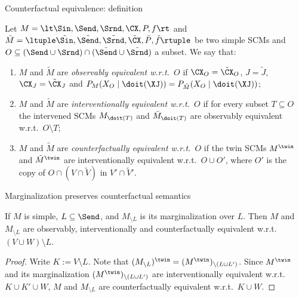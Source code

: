 \begin{frame}{Counterfactual equivalence: definition}
  \begin{Def}[\ref{def:scm_counterfactual_equiv}]
  Let $M = \lt \Sin, \Send, \Srnd, \CX, P, f \rt$ and
  $\tilde{M} = \ltuple \tilde{\Sin}, \tilde{\Send}, \tilde{\Srnd}, \tilde{\CX}, \tilde{P}, \tilde{f} \rtuple$ be two simple SCMs
  and $O \subseteq (\Send \cup \Srnd) \cap (\tilde{\Send} \cup \tilde{\Srnd})$ a subset.
  We say that:
  \begin{enumerate}
    \item {\color{gray}$M$ and $\tilde{M}$ are \emph{observably equivalent w.r.t.\ $O$} if $\CX_O = \tilde{\CX}_O$, $J = \tilde{J}$, $\CX_J = \tilde{\CX}_J$ and $P_{M}(X_O \mid \doit(\XJ)) = P_{\tilde{M}}(X_O \mid \doit(\XJ))$;}
    \item {\color{gray}$M$ and $\tilde{M}$ are \emph{interventionally equivalent w.r.t.\ $O$} if for every subset $T \subseteq O$ the intervened SCMs $M_{\doit(T)}$ and $\tilde{M}_{\doit(T)}$ are observably equivalent w.r.t.\ $O \setminus T$;}
    \item $M$ and $\tilde{M}$ are \emph{counterfactually equivalent w.r.t.\ $O$} if the twin SCMs $M^\twin$ and $\tilde{M}^\twin$ are interventionally equivalent w.r.t.\ $O \cup O'$, where
    $O'$ is the copy of $O \cap (V \cap \tilde{V})$ in $V' \cap \tilde{V}'$.
  \end{enumerate}
  \end{Def}
\end{frame}

\begin{frame}{Marginalization preserves counterfactual semantics}
  \begin{Cor}[\ref{Cor:various_equiv_marginalization}]
  If $M$ is simple, $L \subseteq \Send$, and
  $M_{\setminus L}$ is its marginalization over $L$. Then $M$ and $M_{\setminus L}$ are {\color{gray}observably,
  interventionally} and counterfactually equivalent w.r.t.\ $(V \cup W) \setminus L$.
  \end{Cor}
\begin{proof}
  Write $K := V \setminus L$.
  Note that $(M_{\setminus L})^\twin = (M^\twin)_{\setminus (L \cup L')}$. 
  Since $M^\twin$ and its marginalization
  $(M^\twin)_{\setminus (L \cup L')}$ are interventionally equivalent w.r.t.\ $K \cup K' \cup W$,
  $M$ and $M_{\setminus L}$ are counterfactually equivalent w.r.t.\ $K \cup W$.
\end{proof}
\end{frame}

